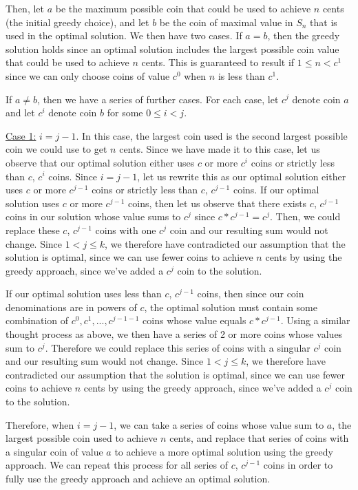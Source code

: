 \documentclass[11pt]{article}
\begin{document}
Then, let $a$ be the maximum possible coin that could be used to achieve $n$ cents (the initial greedy choice), and let $b$ be the coin of maximal value in $S_n$ that is used in the optimal solution. We then have two cases. If $a=b$, then the greedy solution holds since an optimal solution includes the largest possible coin value that could be used to achieve $n$ cents. This is guaranteed to result if $1 \leq n < c^1$ since we can only choose coins of value $c^0$ when $n$ is less than $c^1$.

If $a \neq b$, then we have a series of further cases. For each case, let $c^j$ denote coin $a$ and let $c^i$ denote coin $b$ for some $0 \leq i < j$.

\underline{Case 1:} $i = j - 1$. In this case, the largest coin used is the second largest possible coin we could use to get $n$ cents. Since we have made it to this case, let us observe that our optimal solution either uses $c$ or more $c^i$ coins or strictly less than $c$, $c^i$ coins. Since $i = j - 1$, let us rewrite this as our optimal solution either uses $c$ or more $c^{j-1}$ coins or strictly less than $c$, $c^{j-1}$ coins. If our optimal solution uses $c$ or more $c^{j-1}$ coins, then let us observe that there exists $c$, $c^{j-1}$ coins in our solution whose value sums to $c^j$ since $c * c^{j-1} = c^j$. Then, we could replace these $c$, $c^{j-1}$ coins with one $c^j$ coin and our resulting sum would not change. Since $1 < j \leq k$, we therefore have contradicted our assumption that the solution is optimal, since we can use fewer coins to achieve $n$ cents by using the greedy approach, since we've added a $c^j$ coin to the solution.

If our optimal solution uses less than $c$, $c^{j-1}$ coins, then since our coin denominations are in powers of $c$, the optimal solution must contain some combination of $c^0, c^1, ..., c^{j-1-1}$ coins whose value equals $c * c^{j-1}$. Using a similar thought process as above, we then have a series of 2 or more coins whose values sum to $c^{j}$. Therefore we could replace this series of coins with a singular $c^j$ coin and our resulting sum would not change. Since $1 < j \leq k$, we therefore have contradicted our assumption that the solution is optimal, since we can use fewer coins to achieve $n$ cents by using the greedy approach, since we've added a $c^j$ coin to the solution.

Therefore, when $i = j - 1$, we can take a series of coins whose value sum to $a$, the largest possible coin used to achieve $n$ cents, and replace that series of coins with a singular coin of value $a$ to achieve a more optimal solution using the greedy approach. We can repeat this process for all series of $c$, $c^{j-1}$ coins in order to fully use the greedy approach and achieve an optimal solution.
\end{document}
